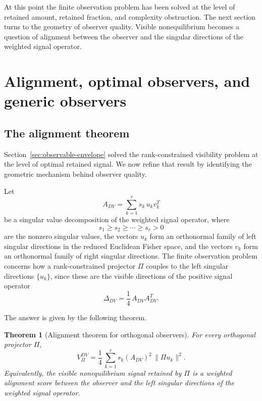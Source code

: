\documentclass[11pt,a4paper]{article}
\numberwithin{equation}{section}
\theoremstyle{thmcompact}
\newtheorem{theorem}{Theorem}[section]
\theoremstyle{remark}
\begin{document}
At this point the finite observation problem has been solved at the level of retained amount, retained fraction, and complexity obstruction. The next section turns to the geometry of observer quality. Visible nonequilibrium becomes a question of alignment between the observer and the singular directions of the weighted signal operator.

\section{Alignment, optimal observers, and generic observers}
\label{sec:alignment-optimal-observers}

\subsection{The alignment theorem}

Section~\ref{sec:observable-envelope} solved the rank-constrained visibility problem at the level of optimal retained signal. We now refine that result by identifying the geometric mechanism behind observer quality.

Let
\begin{equation}
A_{DV}
=
\sum_{k=1}^{r} s_k\,u_k v_k^T
\end{equation}
be a singular value decomposition of the weighted signal operator, where
\begin{equation}
s_1\ge s_2\ge \cdots \ge s_r>0
\end{equation}
are the nonzero singular values, the vectors \(u_k\) form an orthonormal family of left singular directions in the reduced Euclidean Fisher space, and the vectors \(v_k\) form an orthonormal family of right singular directions. The finite observation problem concerns how a rank-constrained projector \(\Pi\) couples to the left singular directions \(\{u_k\}\), since these are the visible directions of the positive signal operator
\begin{equation}
\Delta_{DV}=\frac14\,A_{DV}A_{DV}^{T}.
\end{equation}

The answer is given by the following theorem.

\begin{theorem}[Alignment theorem for orthogonal observers]
\label{thm:alignment_theorem}
For every orthogonal projector \(\Pi\),
\begin{equation}
V_\Pi^{DV}
=
\frac14\,\sum_{k=1}^{r} s_k(A_{DV})^2\,\|\Pi u_k\|^2.
\end{equation}
Equivalently, the visible nonequilibrium signal retained by \(\Pi\) is a weighted alignment score between the observer and the left singular directions of the weighted signal operator.
\end{theorem}
\end{document}
